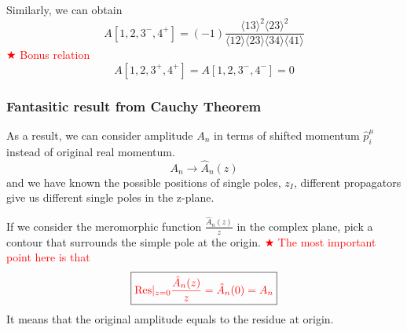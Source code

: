 \documentclass{beamer}
\newcommand{\avg}[1]{\langle #1 \rangle}
\newcommand{\mdavg}[2]{\langle #1 \rangle\!\langle #2 \rangle}
\begin{document}
\begin{frame}
    Similarly, we can obtain
    \begin{equation*}
        A[1,2,3^-,4^+]=(-1)\frac{\avg{13}^2\avg{23}^2}{\mdavg{12}{23}\!\mdavg{34}{41}}
    \end{equation*}
    \textcolor{red}{$\bigstar$ Bonus relation}
    \begin{equation*}
        A[1,2,3^+,4^+]=A[1,2,3^-,4^-]=0
    \end{equation*}
\end{frame}
\begin{frame}
    \frametitle{Fantasitic result from Cauchy Theorem}
    As a result, we can consider amplitude $A_n$ in terms of shifted momentum $\hat{p}_i^\mu$ instead of original real momentum. 
    \begin{equation*}
        A_n \longrightarrow \hat{A}_n(z)
    \end{equation*}
    and we have known the possible positions of single poles, $z_I$, different propagators give 
    us different single poles in the z-plane. 
    \par
    If we consider the meromorphic function $\frac{\hat{A}_n(z)}{z}$ in the complex plane, pick a contour that surrounds the simple pole at the origin. 
    \textcolor{red}{$\bigstar$ The most important point here is that}
    \begin{equation*}
        \boxed{\color{red}\mathrm{Res}|_{z=0}\frac{\hat{A}_n(z)}{z}=\hat{A}_n(0)=A_n}
    \end{equation*}
    It means that the original amplitude equals to the residue at origin.
\end{frame}
\end{document}
